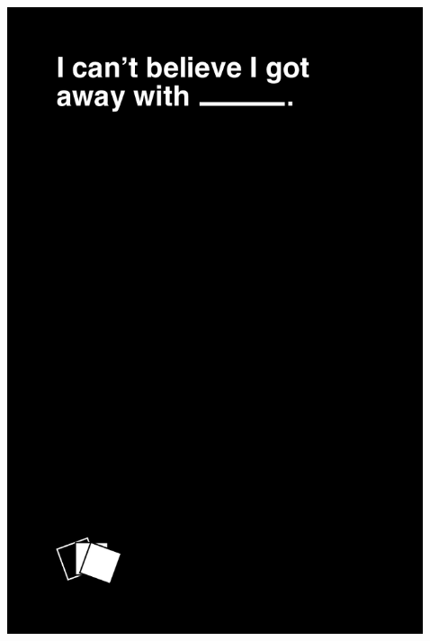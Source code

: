 \documentclass{beamer}
\begin{document}
\begin{frame}


\begin{columns}
        \begin{column}[t]{0.1\textwidth}
        \end{column}
        \begin{column}[t]{0.3\textwidth}
                \includegraphics[width=.9\textwidth]{../images/black_FRONT012.png} %
        \end{column}
        \begin{column}[t]{0.3\textwidth}

\end{column}
\end{columns}
\end{frame}
\end{document}
